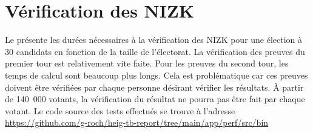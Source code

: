 \documentclass[../report]{subfiles}
\begin{document}
\section{Vérification des NIZK}

Le  présente les durées nécessaires à la vérification des NIZK pour une élection à 30 candidats en fonction 
de la taille de l'électorat.
La vérification des preuves du premier tour est relativement vite faite.
Pour les preuves du second tour, les temps de calcul sont beaucoup plus longs.
Cela est problématique car ces preuves doivent être vérifiées par chaque personne désirant vérifier les résultats.
À partir de 140~000 votants, la vérification du résultat ne pourra pas être fait par chaque votant.
Le code source des tests effectués se trouve à l'adresse \url{https://github.com/g-roch/heig-tb-report/tree/main/app/perf/src/bin}
\end{document}
